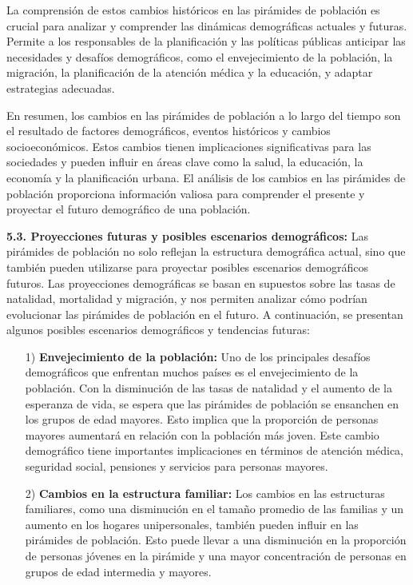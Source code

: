 \documentclass[8pt,a4paper]{beamer}
\begin{document}
{\begin{frame}{}
\begin{block}{}
La comprensión de estos cambios históricos en las pirámides de población es crucial para analizar y comprender las dinámicas demográficas actuales y futuras. Permite a los responsables de la planificación y las políticas públicas anticipar las necesidades y desafíos demográficos, como el envejecimiento de la población, la migración, la planificación de la atención médica y la educación, y adaptar estrategias adecuadas.

En resumen, los cambios en las pirámides de población a lo largo del tiempo son el resultado de factores demográficos, eventos históricos y cambios socioeconómicos. Estos cambios tienen implicaciones significativas para las sociedades y pueden influir en áreas clave como la salud, la educación, la economía y la planificación urbana. El análisis de los cambios en las pirámides de población proporciona información valiosa para comprender el presente y proyectar el futuro demográfico de una población.
\end{block}
\end{frame}

\begin{frame}{}
\begin{block}{\textbf{5.3. Proyecciones futuras y posibles escenarios demográficos:}}
\justifying
Las pirámides de población no solo reflejan la estructura demográfica actual, sino que también pueden utilizarse para proyectar posibles escenarios demográficos futuros. Las proyecciones demográficas se basan en supuestos sobre las tasas de natalidad, mortalidad y migración, y nos permiten analizar cómo podrían evolucionar las pirámides de población en el futuro. A continuación, se presentan algunos posibles escenarios demográficos y tendencias futuras:
\begin{enumerate}
\justifying

\item[1)] \textbf{Envejecimiento de la población:} Uno de los principales desafíos demográficos que enfrentan muchos países es el envejecimiento de la población. Con la disminución de las tasas de natalidad y el aumento de la esperanza de vida, se espera que las pirámides de población se ensanchen en los grupos de edad mayores. Esto implica que la proporción de personas mayores aumentará en relación con la población más joven. Este cambio demográfico tiene importantes implicaciones en términos de atención médica, seguridad social, pensiones y servicios para personas mayores.

\item[2)] \textbf{Cambios en la estructura familiar:} Los cambios en las estructuras familiares, como una disminución en el tamaño promedio de las familias y un aumento en los hogares unipersonales, también pueden influir en las pirámides de población. Esto puede llevar a una disminución en la proporción de personas jóvenes en la pirámide y una mayor concentración de personas en grupos de edad intermedia y mayores.
\end{enumerate}
\end{block}
\end{frame}


}
\end{document}
